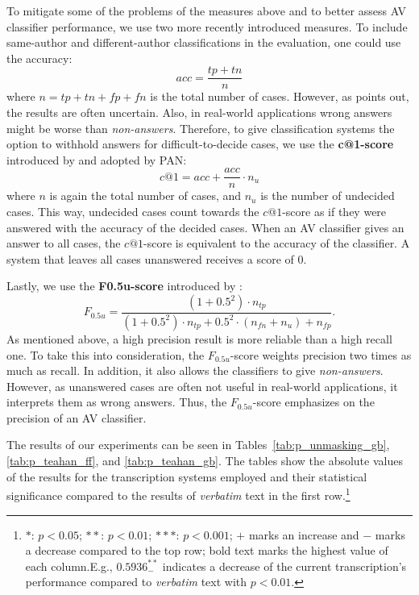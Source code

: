 To mitigate some of the problems of the measures above and to better assess AV classifier performance, we use two more recently introduced measures.
To include same-author and different-author classifications in the evaluation, one could use the accuracy: \[acc = \frac{tp+tn}{n}\] where $n = tp+tn+fp+fn$ is the total number of cases.
However, as \cite{bevendorff2019unmaskingShortTexts} points out, the results are often uncertain.
Also, in real-world applications wrong answers might be worse than \textit{non-answers}.
Therefore, to give classification systems the option to withhold answers for difficult-to-decide cases, we use the \textbf{c@1-score} introduced by \cite{penas2011c_at_1} and adopted by PAN: \[c@1 = acc + \frac{acc}{n}\cdot{}n_u\] where $n$ is again the total number of cases, and $n_u$ is the number of undecided cases.
This way, undecided cases count towards the $c@1$-score as if they were answered with the accuracy of the decided cases.
When an AV classifier gives an answer to all cases, the $c@1$-score is equivalent to the accuracy of the classifier.
A system that leaves all cases unanswered receives a score of 0.

Lastly, we use the \textbf{F0.5u-score} introduced by \cite{bevendorff2019unmaskingShortTexts}: \[F_{0.5u} = \frac{(1+0.5^2)\cdot{}n_{tp}}{(1+0.5^2)\cdot{}n_{tp}+0.5^2\cdot{}(n_{fn}+n_u)+n_{fp}}.\]
As mentioned above, a high precision result is more reliable than a high recall one.
To take this into consideration, the $F_{0.5u}$-score weights precision two times as much as recall.
In addition, it also allows the classifiers to give \textit{non-answers}.
However, as unanswered cases are often not useful in real-world applications, it interprets them as wrong answers.
Thus, the $F_{0.5u}$-score emphasizes on the precision of an AV classifier.\newline

The results of our experiments can be seen in Tables~\ref{tab:p_unmasking_gb}, \ref{tab:p_teahan_ff}, and \ref{tab:p_teahan_gb}.
The tables show the absolute values of the results for the transcription systems employed and their statistical significance compared to the results of \textit{verbatim} text in the first row.\footnote{$\ast$: $p < 0.05$; $\ast\ast$: $p < 0.01$; $\ast\ast\ast$: $p < 0.001$; $+$ marks an increase and $-$ marks a decrease compared to the top row; bold text marks the highest value of each column.\newline{}E.g., $0.5936^{\ast\ast}_{-}$ indicates a decrease of the current transcription's performance compared to \textit{verbatim} text with $p < 0.01$.}

